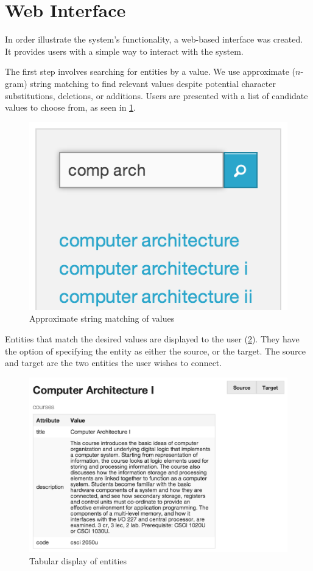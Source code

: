 \section{Web Interface}
\label{sec:web-interface}
	In order illustrate the system's functionality, a web-based interface was created.  It provides users with a simple way to interact with the system.
	
	The first step involves searching for entities by a value.  We use approximate (\(n\)-gram) string matching to find relevant values despite potential character substitutions, deletions, or additions.  Users are presented with a list of candidate values to choose from, as seen in \cref{fig:webui-step-1}.
	
	\begin{figure}[H]
		\centering
		\includegraphics[scale=0.5]{figures/images/step-1}
		
		\caption{Approximate string matching of values}
		\label{fig:webui-step-1}
	\end{figure}
	
	Entities that match the desired values are displayed to the user (\cref{fig:webui-step-2}).  They have the option of specifying the entity as either the source, or the target.  The source and target are the two entities the user wishes to connect.
	
	\begin{figure}[H]
		\centering
		\includegraphics[scale=0.5]{figures/images/step-2}
		
		\caption{Tabular display of entities}
		\label{fig:webui-step-2}
	\end{figure}
	
